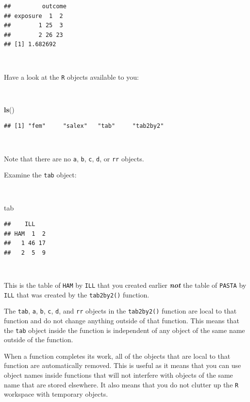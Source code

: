 \documentclass[12pt,a4paper]{book}
\newenvironment{Shaded}{\begin{snugshade}}{\end{snugshade}}
\newcommand{\KeywordTok}[1]{\textcolor[rgb]{0.13,0.29,0.53}{\textbf{#1}}}
\newcommand{\NormalTok}[1]{#1}
\theoremstyle{definition}
\theoremstyle{definition}
\theoremstyle{definition}
\theoremstyle{remark}
\begin{document}
\begin{verbatim}
##         outcome
## exposure  1  2
##        1 25  3
##        2 26 23
## [1] 1.682692
\end{verbatim}

~

Have a look at the \texttt{R} objects available to you:

~

\begin{Shaded}
\begin{Highlighting}[]
\KeywordTok{ls}\NormalTok{()}
\end{Highlighting}
\end{Shaded}

\begin{verbatim}
## [1] "fem"     "salex"   "tab"     "tab2by2"
\end{verbatim}

~

Note that there are no \texttt{a}, \texttt{b}, \texttt{c}, \texttt{d},
or \texttt{rr} objects.

\newpage

Examine the \texttt{tab} object:

~

\begin{Shaded}
\begin{Highlighting}[]
\NormalTok{tab}
\end{Highlighting}
\end{Shaded}

\begin{verbatim}
##    ILL
## HAM  1  2
##   1 46 17
##   2  5  9
\end{verbatim}

~

This is the table of \texttt{HAM} by \texttt{ILL} that you created
earlier \textbf{\emph{not}} the table of \texttt{PASTA} by \texttt{ILL}
that was created by the \texttt{tab2by2()} function.

The \texttt{tab}, \texttt{a}, \texttt{b}, \texttt{c}, \texttt{d}, and
\texttt{rr} objects in the \texttt{tab2by2()} function are local to that
function and do not change anything outside of that function. This means
that the \texttt{tab} object inside the function is independent of any
object of the same name outside of the function.

When a function completes its work, all of the objects that are local to
that function are automatically removed. This is useful as it means that
you can use object names inside functions that will not interfere with
objects of the same name that are stored elsewhere. It also means that
you do not clutter up the \texttt{R} workspace with temporary objects.
\end{document}
